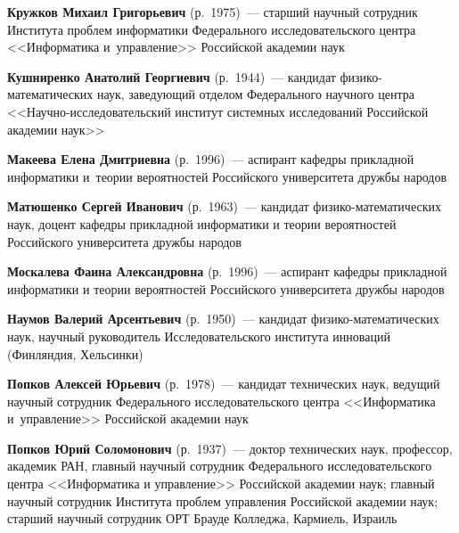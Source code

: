 \begin{multicols}{2}
\smallskip 

 \noindent
\textbf{Кружков Михаил Григорьевич} (р.\ 1975)~--- старший научный сотрудник Института 
проблем информатики Федерального исследовательского цент\-ра <<Информатика 
и~управ\-ле\-ние>> Российской академии наук 

\smallskip  

\noindent
\textbf{Кушниренко Анатолий Георгиевич} (р.\ 1944)~--- кандидат фи\-зи\-ко-ма\-те\-ма\-ти\-че\-ских 
наук, заведующий отделом Федерального научного цент\-ра <<Научно-ис\-сле\-до\-ва\-тель\-ский институт 
системных исследований Российской академии наук>> 

\smallskip  

\noindent
\textbf{Макеева Елена Дмитриевна} (р.\ 1996)~--- аспирант кафедры прикладной информатики 
и~теории вероятностей Российского университета дружбы народов

\smallskip  

\noindent
\textbf{Матюшенко Сергей Иванович} (р.\ 1963)~--- кандидат фи\-зи\-ко-ма\-те\-ма\-ти\-чес\-ких 
наук, доцент кафедры прикладной информатики и теории вероятностей Российского университета дружбы 
народов

\smallskip  

\noindent
\textbf{Москалева Фаина Александровна} (р.\ 1996)~--- аспирант кафедры прикладной 
информатики и теории вероятностей Российского университета дружбы народов

\smallskip  

\noindent
\textbf{Наумов Валерий Арсентьевич} (р.\ 1950)~--- кандидат фи\-зи\-ко-ма\-те\-ма\-ти\-чес\-ких 
наук, научный руководитель Исследовательского института инноваций (Финляндия, Хельсинки)

\smallskip  

\noindent
\textbf{Попков Алексей Юрьевич} (р.\ 1978)~--- кандидат технических наук, ведущий 
научный сотрудник Федерального исследовательского центра <<Информатика 
и~управ\-ле\-ние>> Российской академии наук

\smallskip 

 \noindent
\textbf{Попков Юрий Соломонович} (р.\ 1937)~--- доктор технических наук, профессор, 
академик РАН, главный научный сотрудник Федерального исследовательского цент\-ра 
<<Информатика и управ\-ле\-ние>> Российской академии наук; главный научный сотрудник 
Института проб\-лем управ\-ле\-ния Российской академии наук; старший научный сотрудник 
ОРТ Брауде Колледжа, Кармиель, Израиль

\smallskip 


\end{multicols}
